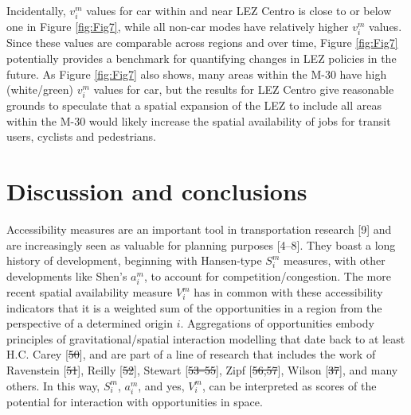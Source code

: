 \documentclass[10pt,letterpaper]{article}
\providecommand{\DIFaddtex}[1]{{\protect\color{blue}\uwave{#1}}} %
\providecommand{\DIFdeltex}[1]{{\protect\color{red}\sout{#1}}}                      %
\providecommand{\DIFaddbegin}{} %
\providecommand{\DIFaddend}{} %
\providecommand{\DIFdelbegin}{} %
\providecommand{\DIFdelend}{} %
\providecommand{\DIFadd}[1]{\texorpdfstring{\DIFaddtex{#1}}{#1}} %
\providecommand{\DIFdel}[1]{\texorpdfstring{\DIFdeltex{#1}}{}} %
\newcommand{\DIFscaledelfig}{0.5}
\newlength{\DIFdelgraphicswidth} %
\newlength{\DIFdelgraphicsheight} %
\newcommand{\DIFaddincludegraphics}[2][]{{\color{blue}\fbox{\DIFOincludegraphics[#1]{#2}}}} %
\newcommand{\DIFdelincludegraphics}[2][]{%
\sbox{\DIFdelgraphicsbox}{\DIFOincludegraphics[#1]{#2}}%
\settoboxwidth{\DIFdelgraphicswidth}{\DIFdelgraphicsbox} %
\settoboxtotalheight{\DIFdelgraphicsheight}{\DIFdelgraphicsbox} %
\scalebox{\DIFscaledelfig}{%
\parbox[b]{\DIFdelgraphicswidth}{\usebox{\DIFdelgraphicsbox}\\[-\baselineskip] \rule{\DIFdelgraphicswidth}{0em}}\llap{\resizebox{\DIFdelgraphicswidth}{\DIFdelgraphicsheight}{%
\setlength{\unitlength}{\DIFdelgraphicswidth}%
\begin{picture}(1,1)%
\thicklines\linethickness{2pt} %
{\color[rgb]{1,0,0}\put(0,0){\framebox(1,1){}}}%
{\color[rgb]{1,0,0}\put(0,0){\line( 1,1){1}}}%
{\color[rgb]{1,0,0}\put(0,1){\line(1,-1){1}}}%
\end{picture}%
}\hspace*{3pt}}} %
} %
\DeclareRobustCommand{\DIFaddbegin}{\DIFOaddbegin \let\includegraphics\DIFaddincludegraphics} %
\DeclareRobustCommand{\DIFaddend}{\DIFOaddend \let\includegraphics\DIFOincludegraphics} %
\DeclareRobustCommand{\DIFdelbegin}{\DIFOdelbegin \let\includegraphics\DIFdelincludegraphics} %
\DeclareRobustCommand{\DIFdelend}{\DIFOaddend \let\includegraphics\DIFOincludegraphics} %
\begin{document}
Incidentally, \(v_i^m\) values for car within and near LEZ Centro is
close to or below one in Figure \ref{fig:Fig7}, while all non-car modes
have relatively higher \(v_i^m\) values. Since these values are
comparable across regions and over time, Figure \ref{fig:Fig7}
potentially provides a benchmark for quantifying changes in LEZ policies
in the future. As Figure \ref{fig:Fig7} also shows, many areas within
the M-30 have high (white/green) \(v_i^m\) values for car, but the
results for LEZ Centro give reasonable grounds to speculate that a
spatial expansion of the LEZ to include all areas within the M-30 would
likely increase the spatial availability of jobs for transit users,
cyclists and pedestrians.

\hypertarget{discussion-and-conclusions}{%
\section{Discussion and conclusions}\label{discussion-and-conclusions}}

Accessibility measures are an important tool in transportation research
{[}9{]} and are increasingly seen as valuable for planning purposes
{[}4--8{]}. They boast a long history of development, beginning with
Hansen-type \(S_i^m\) measures, with other developments like Shen's
\(a_i^m\), to account for competition/congestion. The more recent
spatial availability measure \(V_i^m\) has in common with these
accessibility indicators that it is a weighted sum of the opportunities
in a region from the perspective of a determined origin \(i\).
Aggregations of opportunities embody principles of gravitational/spatial
interaction modelling that date back to at least H.C. Carey {[}\DIFdelbegin \DIFdel{50}\DIFdelend \DIFaddbegin \DIFadd{61}\DIFaddend {]},
and are part of a line of research that includes the work of Ravenstein
{[}\DIFdelbegin \DIFdel{51}\DIFdelend \DIFaddbegin \DIFadd{62}\DIFaddend {]}, Reilly {[}\DIFdelbegin \DIFdel{52}\DIFdelend \DIFaddbegin \DIFadd{63}\DIFaddend {]}, Stewart {[}\DIFdelbegin \DIFdel{53--55}\DIFdelend \DIFaddbegin \DIFadd{64--66}\DIFaddend {]}, Zipf {[}\DIFdelbegin \DIFdel{56,57}\DIFdelend \DIFaddbegin \DIFadd{67,68}\DIFaddend {]},
Wilson {[}\DIFdelbegin \DIFdel{37}\DIFdelend \DIFaddbegin \DIFadd{48}\DIFaddend {]}, and many others. In this way, \(S_i^m\), \(a_i^m\), and
yes, \(V_i^m\), can be interpreted as scores of the potential for
interaction with opportunities in space.
\end{document}
